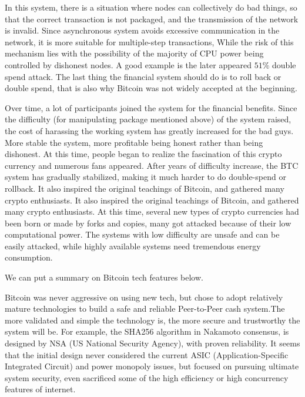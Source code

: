 \begin{flushleft}
    In this system, there is a situation where nodes can collectively do bad things, so that the correct transaction is not packaged, and the transmission of the network is invalid. Since asynchronous system avoids excessive communication in the network, it is more suitable for multiple-step transactions, While the risk of this mechanism lies with the possibility of the majority of CPU power being controlled by dishonest nodes. A good example is the later appeared $51\%$ double spend attack. The last thing the financial system should do is to roll back or double spend, that is also why Bitcoin was not widely accepted at the beginning.
\end{flushleft}
\begin{flushleft}
    Over time, a lot of participants joined the system for the financial benefits. Since the difficulty (for manipulating package mentioned above) of the system raised, the cost of harassing the working system has greatly increased for the bad guys. More stable the system, more profitable being honest rather than being dishonest. At this time, people began to realize the fascination of this crypto currency and numerous fans appeared. After years of difficulty increase, the BTC system has gradually stabilized, making it much harder to do double-spend or rollback. It also inspired the original teachings of Bitcoin, and gathered many crypto enthusiasts. It also inspired the original teachings of Bitcoin, and gathered many crypto enthusiasts. At this time, several new types of crypto currencies had been born or made by forks and copies, many got attacked because of their low computational power. The systems with low difficulty are unsafe and can be easily attacked, while highly available systems need tremendous energy consumption.
\end{flushleft}
\begin{flushleft}
    We can put a summary on Bitcoin tech features below.
\end{flushleft}
\begin{flushleft}
    Bitcoin was never aggressive on using new tech, but chose to adopt relatively mature technologies to build a safe and reliable Peer-to-Peer cash system.The more validated and simple the technology is, the more secure and trustworthy the system will be. For example, the SHA256 algorithm in Nakamoto consensus, is designed by NSA (US National Security Agency), with proven reliability. It seems that the initial design never considered the current ASIC (Application-Specific Integrated Circuit) and power monopoly issues, but focused on pursuing ultimate system security, even sacrificed some of the high efficiency or high concurrency features of internet.
\end{flushleft}
